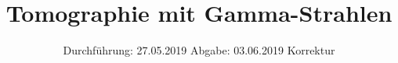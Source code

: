 

\subject{V14}
\title{Tomographie mit Gamma-Strahlen}
\date{%
  Durchführung: 27.05.2019
  \hspace{3em}
  Abgabe: 03.06.2019
  Korrektur
}



\maketitle
\thispagestyle{empty}
\tableofcontents
\newpage






\printbibliography{}


